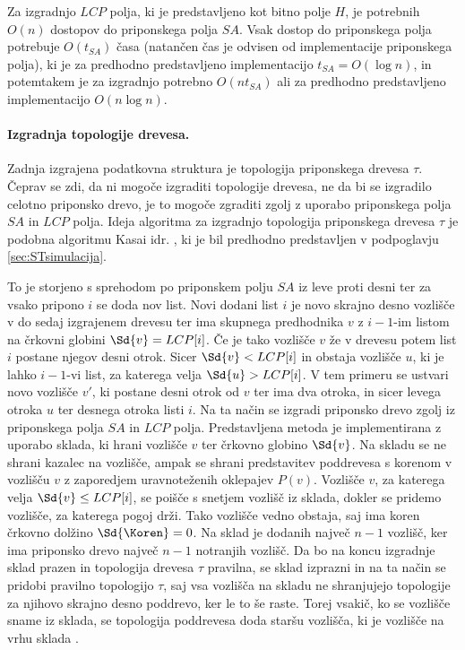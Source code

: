 Za izgradnjo $LCP$ polja, ki je predstavljeno kot bitno polje $H$, je potrebnih $O(n)$ dostopov do priponskega polja $SA$. Vsak dostop do priponskega polja potrebuje $O(t_{SA})$ časa (natančen čas je odvisen od implementacije priponskega polja), ki je za predhodno predstavljeno implementacijo $t_{SA}= O(\log{n})$, in potemtakem je za izgradnjo potrebno $O(nt_{SA})$ ali za predhodno predstavljeno implementacijo $O(n\log{n})$.

\paragraph{Izgradnja topologije drevesa.}
Zadnja izgrajena podatkovna struktura je topologija priponskega drevesa $\tau$. Čeprav se zdi, da ni mogoče izgraditi topologije drevesa, ne da bi se izgradilo celotno priponsko drevo, je to mogoče zgraditi zgolj z uporabo priponskega polja $SA$ in $LCP$ polja. Ideja algoritma za izgradnjo topologija priponskega drevesa $\tau$ je podobna algoritmu Kasai idr. \cite{Kasai2001}, ki je bil predhodno predstavljen v podpoglavju \ref{sec:STsimulacija}.

To je storjeno s sprehodom po priponskem polju $SA$ iz leve proti desni ter za vsako pripono $i$ se doda nov list. Novi dodani list $i$ je novo skrajno desno vozlišče v do sedaj izgrajenem drevesu ter ima skupnega predhodnika $v$ z $i-1$-im listom na črkovni globini $\Sd{v}=LCP[i]$. Če je tako vozlišče $v$ že v drevesu potem list $i$ postane njegov desni otrok. Sicer $\Sd{v}<LCP[i]$ in obstaja vozlišče $u$, ki je lahko $i-1$-vi list, za katerega velja $\Sd{u}>LCP[i]$. V tem primeru se ustvari novo vozlišče $v'$, ki postane desni otrok od $v$ ter ima dva otroka, in sicer levega otroka $u$ ter desnega otroka listi $i$. Na ta način se izgradi priponsko drevo zgolj iz priponskega polja $SA$ in $LCP$ polja. Predstavljena metoda je implementirana z uporabo sklada, ki hrani vozlišče $v$ ter črkovno globino $\Sd{v}$. Na skladu se ne shrani kazalec na vozlišče, ampak se shrani predstavitev poddrevesa s korenom v vozlišču $v$ z zaporedjem uravnoteženih oklepajev $P(v)$. Vozlišče $v$, za katerega velja $\Sd{v}\le LCP[i]$, se poišče s snetjem vozlišč iz sklada, dokler se pridemo vozlišče, za katerega pogoj drži. Tako vozlišče vedno obstaja, saj ima koren črkovno dolžino $\Sd{\Koren}=0$. Na sklad je dodanih največ $n-1$ vozlišč, ker ima priponsko drevo največ $n-1$ notranjih vozlišč. Da bo na koncu izgradnje sklad prazen in topologija drevesa $\tau$ pravilna, se sklad izprazni in na ta način se pridobi pravilno topologijo $\tau$, saj vsa vozlišča na skladu ne shranjujejo topologije za njihovo skrajno desno poddrevo, ker le to še raste. Torej vsakič, ko se vozlišče sname iz sklada, se topologija poddrevesa doda staršu vozlišča, ki je vozlišče na vrhu sklada \cite{Navarro2016}.

